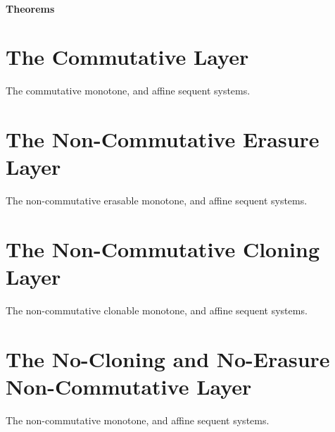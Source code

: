 \begin{center}
		\subsection{Theorems}
		\begin{center}
		\end{center}

\end{center}

\newpage
\part{The Commutative Layer}
\begin{center}
	The commutative monotone, and affine sequent systems.
\end{center}

\newpage
\part{The Non-Commutative Erasure Layer}
\begin{center}
	The non-commutative erasable monotone, and affine sequent systems.
\end{center}

\newpage
\part{The Non-Commutative Cloning Layer}
\begin{center}
	The non-commutative clonable monotone, and affine sequent systems.
\end{center}

\newpage
\part{The No-Cloning and No-Erasure Non-Commutative Layer}
\begin{center}
	The non-commutative monotone, and affine sequent systems.
\end{center}



